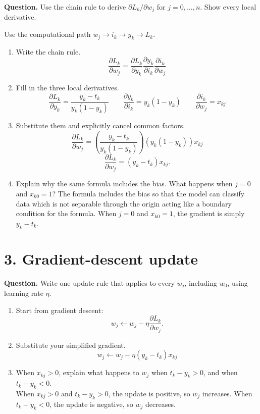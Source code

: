 \documentclass[11pt]{article}
\begin{document}
\textbf{Question.} Use the chain rule to derive $\partial L_k/\partial w_j$ for $j=0,\ldots,n$. Show every local derivative.

Use the computational path $w_j \rightarrow i_k \rightarrow y_k \rightarrow L_k$.

\begin{enumerate}[label=\arabic*.]
    \item Write the chain rule.
    \[
    \frac{\partial L_k}{\partial w_j}
    = \frac{\partial L_k}{\partial y_k}
      \frac{\partial y_k}{\partial i_k}
      \frac{\partial i_k}{\partial w_j}
    \]
    \item Fill in the three local derivatives.
    \[
    \frac{\partial L_k}{\partial y_k}=\frac{y_k-t_k}{y_k(1-y_k)} \qquad
    \frac{\partial y_k}{\partial i_k}=y_k(1-y_k) \qquad
    \frac{\partial i_k}{\partial w_j}=x_{kj}
    \]
    \item Substitute them and explicitly cancel common factors.
    \[
    \frac{\partial L_k}{\partial w_j}
    =
    \left(\frac{y_k-t_k}{y_k(1-y_k)}\right)
    \left(y_k(1-y_k)\right)
    x_{kj}
    \]
    \[
    \frac{\partial L_k}{\partial w_j}
    =
    (y_k-t_k)x_{kj}.
    \]
    \item Explain why the same formula includes the bias. What happens when $j=0$ and $x_{k0}=1$?
    The formula includes the bias so that the model can classify data which is not separable 
    through the origin acting like a boundary condition for the formula. When $j=0$ and $x_{k0}=1$, 
    the gradient is simply $y_k-t_k$.
\end{enumerate}

\section*{3. Gradient-descent update}

\textbf{Question.} Write one update rule that applies to every $w_j$, including $w_0$, using learning rate $\eta$.

\begin{enumerate}[label=\arabic*.]
    \item Start from gradient descent:
    \[
    w_j \leftarrow w_j - \eta\frac{\partial L_k}{\partial w_j}.
    \]
    \item Substitute your simplified gradient.
    \[
    w_j \leftarrow w_j - \eta(y_k-t_k)x_{kj}
    \]
    \item When $x_{kj}>0$, explain what happens to $w_j$ when $t_k-y_k>0$, and when $t_k-y_k<0$. \\
    When $x_{kj}>0$ and $t_k-y_k>0$, the update is positive, so
    $w_j$ increases. When $t_k-y_k<0$, the update is negative, so
    $w_j$ decreases.
\end{enumerate}
\pagebreak
\end{document}
